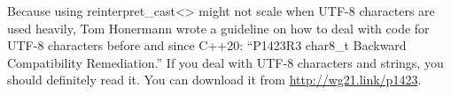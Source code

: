 Because using reinterpret\_cast<> might not scale when UTF-8 characters are used heavily, Tom Honermann wrote a guideline on how to deal with code for UTF-8 characters before and since C++20: “P1423R3 char8\_t Backward Compatibility Remediation.” If you deal with UTF-8 characters and strings, you should definitely read it. You can download it from \url{http://wg21.link/p1423}.

































